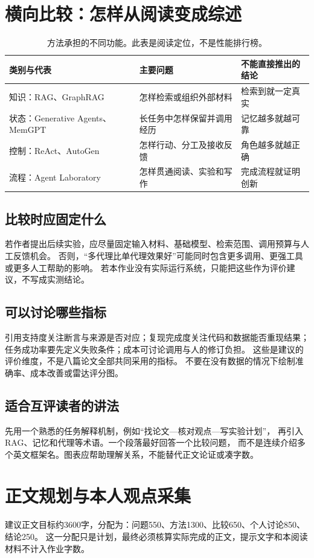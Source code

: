 \documentclass[UTF8,fontset=fandol,12pt,a4paper]{ctexart}
\begin{document}
\section{横向比较：怎样从阅读变成综述}
\begin{table}[htbp]\centering\small
\caption{方法承担的不同功能。此表是阅读定位，不是性能排行榜。}
\begin{tabularx}{\linewidth}{@{}p{28mm}XX@{}}\toprule
类别与代表 & 主要问题 & 不能直接推出的结论\\\midrule
知识：RAG、GraphRAG & 怎样检索或组织外部材料 & 检索到就一定真实\\
状态：Generative Agents、MemGPT & 长任务中怎样保留并调用经历 & 记忆越多就越可靠\\
控制：ReAct、AutoGen & 怎样行动、分工及接收反馈 & 角色越多就越正确\\
流程：Agent Laboratory & 怎样贯通阅读、实验和写作 & 完成流程就证明创新\\\bottomrule
\end{tabularx}\end{table}

\subsection{比较时应固定什么}
若作者提出后续实验，应尽量固定输入材料、基础模型、检索范围、调用预算与人工反馈机会。
否则，“多代理比单代理效果好”可能同时包含更多调用、更强工具或更多人工帮助的影响。
若本作业没有实际运行系统，只能把这些作为评价建议，不写成实测结论。

\subsection{可以讨论哪些指标}
引用支持度关注断言与来源是否对应；复现完成度关注代码和数据能否重现结果；
任务成功率要先定义失败条件；成本可讨论调用与人的修订负担。
这些是建议的评价维度，不是八篇论文全部共同采用的指标。
不要在没有数据的情况下绘制准确率、成本改善或雷达评分图。

\subsection{适合互评读者的讲法}
先用一个熟悉的任务解释机制，例如“找论文—核对观点—写实验计划”，
再引入RAG、记忆和代理等术语。一个段落最好回答一个比较问题，
而不是连续介绍多个英文框架名。图表应帮助理解关系，不能替代正文论证或凑字数。

\clearpage
\section{正文规划与本人观点采集}
建议正文目标约3600字，分配为：问题550、方法1300、比较650、个人讨论850、结论250。
这一分配只是计划，最终必须核算实际完成的正文，提示文字和本阅读材料不计入作业字数。
\end{document}
